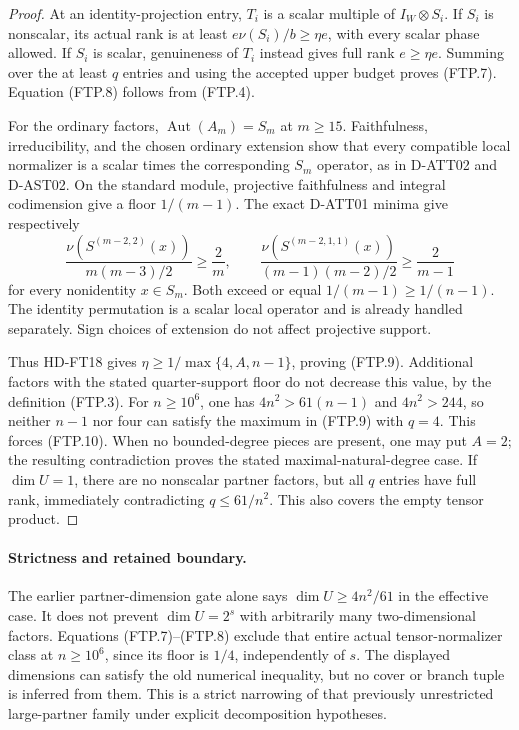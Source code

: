 \begin{proof}
At an identity-projection entry, \(T_i\) is a scalar multiple of
\(I_W\otimes S_i\).  If \(S_i\) is nonscalar, its actual rank is
at least \(e\nu(S_i)/b\ge\eta e\), with every scalar phase
allowed.  If \(S_i\) is scalar, genuineness of \(T_i\) instead
gives full rank \(e\ge\eta e\).  Summing over the at least \(q\)
entries and using the accepted upper budget proves (FTP.7).
Equation (FTP.8) follows from (FTP.4).

For the ordinary factors, \(\operatorname{Aut}(A_m)=S_m\) at
\(m\ge15\).  Faithfulness, irreducibility, and the chosen
ordinary extension show that every compatible local normalizer
is a scalar times the corresponding \(S_m\) operator, as in
D-ATT02 and D-AST02.  On the standard module, projective
faithfulness and integral codimension give a floor \(1/(m-1)\).
The exact D-ATT01 minima give respectively
\[
 \frac{\nu(S^{(m-2,2)}(x))}{m(m-3)/2}\ge\frac2m,
 \qquad
 \frac{\nu(S^{(m-2,1,1)}(x))}{(m-1)(m-2)/2}
                                  \ge\frac2{m-1}
 \tag{FTP.11}
\]
for every nonidentity \(x\in S_m\).  Both exceed or equal
\(1/(m-1)\ge1/(n-1)\).  The identity permutation is a scalar
local operator and is already handled separately.  Sign choices
of extension do not affect projective support.

Thus HD-FT18 gives
\(\eta\ge1/\max\{4,A,n-1\}\), proving (FTP.9).
Additional factors with the stated quarter-support floor do not
decrease this value, by the definition (FTP.3).
For \(n\ge10^6\), one has \(4n^2>61(n-1)\) and
\(4n^2>244\), so neither \(n-1\) nor four can satisfy the
maximum in (FTP.9) with \(q=4\).  This forces (FTP.10).
When no bounded-degree pieces are present, one may put \(A=2\);
the resulting contradiction proves the stated maximal-natural-degree
case.  If \(\dim U=1\), there are no nonscalar partner factors,
but all \(q\) entries have full rank, immediately contradicting
\(q\le61/n^2\).  This also covers the empty tensor product.
\end{proof}

\paragraph{Strictness and retained boundary.}
The earlier partner-dimension gate alone says
\(\dim U\ge4n^2/61\) in the effective case.  It does not prevent
\(\dim U=2^s\) with arbitrarily many two-dimensional factors.
Equations (FTP.7)--(FTP.8) exclude that entire actual tensor-normalizer
class at \(n\ge10^6\), since its floor is \(1/4\), independently
of \(s\).  The displayed dimensions can satisfy the old numerical
inequality, but no cover or branch tuple is inferred from them.
This is a strict narrowing of that previously unrestricted
large-partner family under explicit decomposition hypotheses.

